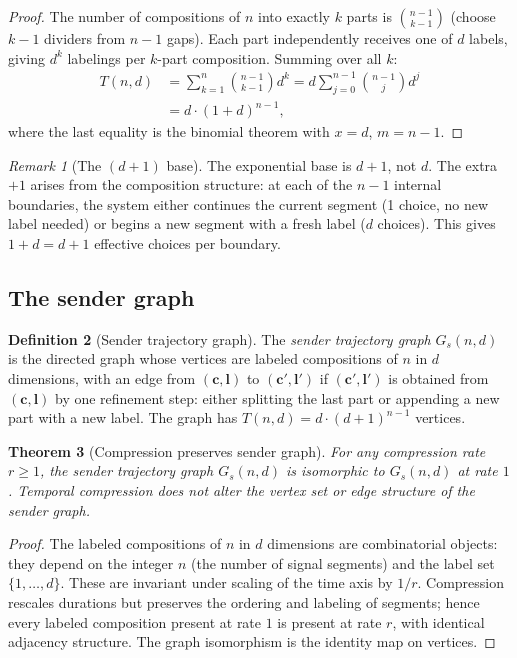 \documentclass[twocolumn,11pt,a4paper]{article}
\theoremstyle{main}
\newtheorem{theorem}{Theorem}[section]
\theoremstyle{definition}
\newtheorem{definition}[theorem]{Definition}
\theoremstyle{remark}
\newtheorem{remark}[theorem]{Remark}
\newcommand{\Traj}{T}
\newcommand{\rate}{r}
\begin{document}
\begin{proof}
The number of compositions of $n$ into exactly $k$ parts is
$\binom{n-1}{k-1}$ (choose $k-1$ dividers from $n-1$ gaps). Each part
independently receives one of $d$ labels, giving $d^k$ labelings per
$k$-part composition. Summing over all $k$:
\begin{align}
\Traj(n,d) &= \sum_{k=1}^{n} \binom{n-1}{k-1} d^k
            = d \sum_{j=0}^{n-1} \binom{n-1}{j} d^j \nonumber \\
           &= d \cdot (1+d)^{n-1},
\end{align}
where the last equality is the binomial theorem with $x = d$, $m = n-1$.
\end{proof}

\begin{remark}[The $(d+1)$ base]
The exponential base is $d+1$, not $d$. The extra $+1$ arises from
the composition structure: at each of the $n-1$ internal boundaries,
the system either continues the current segment (1 choice, no new
label needed) or begins a new segment with a fresh label ($d$ choices).
This gives $1 + d = d+1$ effective choices per boundary.
\end{remark}

\subsection{The sender graph}

\begin{definition}[Sender trajectory graph]
\label{def:sendergraph}
The \emph{sender trajectory graph} $G_s(n,d)$ is the directed graph
whose vertices are labeled compositions of $n$ in $d$ dimensions, with
an edge from $(\mathbf{c}, \mathbf{l})$ to $(\mathbf{c}', \mathbf{l}')$
if $(\mathbf{c}', \mathbf{l}')$ is obtained from $(\mathbf{c},
\mathbf{l})$ by one refinement step: either splitting the last part or
appending a new part with a new label. The graph has $\Traj(n,d) = d
\cdot (d+1)^{n-1}$ vertices.
\end{definition}

\begin{theorem}[Compression preserves sender graph]
\label{thm:senderpreserved}
For any compression rate $\rate \geq 1$, the sender trajectory graph
$G_s(n,d)$ is isomorphic to $G_s(n,d)$ at rate $1$. Temporal
compression does not alter the vertex set or edge structure of the
sender graph.
\end{theorem}

\begin{proof}
The labeled compositions of $n$ in $d$ dimensions are combinatorial
objects: they depend on the integer $n$ (the number of signal segments)
and the label set $\{1,\ldots,d\}$. These are invariant under scaling
of the time axis by $1/\rate$. Compression rescales durations but
preserves the ordering and labeling of segments; hence every labeled
composition present at rate $1$ is present at rate $\rate$, with
identical adjacency structure. The graph isomorphism is the identity map
on vertices.
\end{proof}
\end{document}
